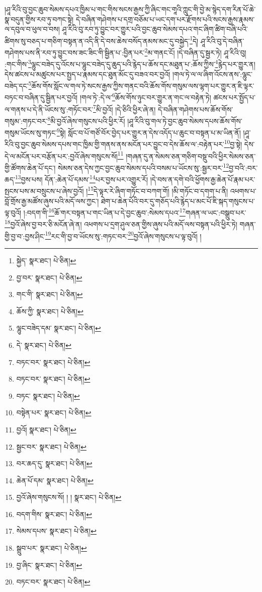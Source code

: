།ཤཱ་རིའི་བུ་བྱང་ཆུབ་སེམས་དཔའ་ཁྱིམ་པ་གང་གིས་སངས་རྒྱས་ཀྱི་ཞིང་གང་གཱའི་ཀླུང་གི་བྱེ་མ་སྙེད་དག་རིན་པོ་ཆེ་སྣ་བདུན་གྱིས་རབ་ཏུ་བཀང་སྟེ། དེ་བཞིན་གཤེགས་པ་དགྲ་བཅོམ་པ་ཡང་དག་པར་རྫོགས་པའི་སངས་རྒྱས་རྣམས་ལ་དབུལ་བ་ཕུལ་བ་བས། ཤཱ་རིའི་བུ་རབ་ཏུ་བྱུང་བར་གྱུར་པའི་བྱང་ཆུབ་སེམས་དཔའ་གང་ཞིག་ཚིག་བཞི་པའི་ཚིགས་སུ་བཅད་པ་གཅིག་བསྟན་ན་འདི་ནི་དེ་བས་ཆེས་བསོད་ནམས་མང་དུ་བསྐྱེད་\footnote{སྐྱེད་  སྣར་ཐང་།  པེ་ཅིན། }དེ། ཤཱ་རིའི་བུ་དེ་བཞིན་གཤེགས་པས་ནི་རབ་ཏུ་བྱུང་བས་ཟང་ཟིང་གི་སྦྱིན་པ་:བྱིན་པར་\footnote{བྱ་བར་  སྣར་ཐང་།  པེ་ཅིན། }མ་གནང་ངོ། །དེ་བཞིན་དུ་སྦྱར་ཏེ། ཤཱ་རིའི་བུ། :གང་གིས་\footnote{གང་གི་  སྣར་ཐང་།  པེ་ཅིན། }ལྷུང་བཟེད་དུ་འོངས་པ་ལྷུང་བཟེད་དུ་ཆུད་པའི་རྙེད་པ་ཆོས་དང་མཐུན་པ་:ཆོས་ཀྱིས་\footnote{ཆོས་ཀྱི་  སྣར་ཐང་།  པེ་ཅིན། }རྙེད་པར་གྱུར་ན། དེས་ཚངས་པ་མཚུངས་པར་སྤྱད་པ་རྣམས་དང་ཐུན་མོང་དུ་བཟའ་བར་བྱའོ། །གལ་ཏེ་ལ་ལ་ཞིག་འོངས་ནས་:ལྷུང་བཟེད་དང་\footnote{ལྷུང་བཟེད་དམ་  སྣར་ཐང་།  པེ་ཅིན། }ཆོས་གོས་སློང་ལ་གལ་ཏེ་སངས་རྒྱས་ཀྱིས་གནང་བའི་ཆོས་གོས་གསུམ་ལས་ལྷག་པར་གྱུར་ན་ཇི་ལྟར་བཏང་བ་བཞིན་དུ་སྦྱིན་པར་བྱའོ། །གལ་ཏེ་:དེ་ལ་\footnote{དེ་  སྣར་ཐང་།  པེ་ཅིན། }ཆོས་གོས་ཉུང་བར་གྱུར་ན་གང་ལ་བརྟེན་ཏེ། ཚངས་པར་སྤྱོད་པ་ལ་གནས་པ་དེ་ནི་ཡོངས་སུ་:གཏོང་བར་\footnote{བཏང་བར་  སྣར་ཐང་།  པེ་ཅིན། }མི་བྱའོ། །དེ་ཅིའི་ཕྱིར་ཞེ་ན། དེ་བཞིན་གཤེགས་པས་ཆོས་གོས་གསུམ་:གཏང་བར་\footnote{བཏང་བར་  སྣར་ཐང་།  པེ་ཅིན། }མི་བྱའོ་ཞེས་གསུངས་པའི་ཕྱིར་རོ། །ཤཱ་རིའི་བུ་གལ་ཏེ་བྱང་ཆུབ་སེམས་དཔས་ཆོས་གོས་གསུམ་ཡོངས་སུ་གཏང་\footnote{བཏང་  སྣར་ཐང་།  པེ་ཅིན། }སྟེ། སློང་བ་པོ་གཙོ་བོར་བྱེད་པར་གྱུར་ན་དེས་འདོད་པ་ཆུང་བ་བསྟན་པ་མ་ཡིན་ནོ། །ཤཱ་རིའི་བུ་བྱང་ཆུབ་སེམས་དཔས་གང་ཁྱིམ་གྱི་གནས་ནས་མངོན་པར་བྱུང་བ་དེས་ཆོས་ལ་:བརྟེན་པར་\footnote{བསྟེན་པར་  སྣར་ཐང་།  པེ་ཅིན། }བྱ་སྟེ། དེས་དེ་ལ་མངོན་པར་བརྩོན་པར་:བྱའོ་ཞེས་གསུངས་སོ།\footnote{བྱའོ།  སྣར་ཐང་།  པེ་ཅིན། } །གཞན་དུ་ན་སེམས་ཅན་གཅིག་བསྡུ་བའི་ཕྱིར་སེམས་ཅན་གྱི་ཚོགས་ཆེན་པོ་དང་། སེམས་ཅན་དེས་ཀྱང་བྱང་ཆུབ་སེམས་དཔའི་བསམ་པ་ཡོངས་སུ་:སྦྱར་བར་\footnote{སྦྱང་བར་  སྣར་ཐང་།  པེ་ཅིན། }བྱ་བའི་:བར་ཆད་\footnote{བར་ཆད་དུ་  སྣར་ཐང་།  པེ་ཅིན། }བྱས་པས། དོན་:ཆེན་པོ་དམས་\footnote{ཆེན་པོ་དམ་  སྣར་ཐང་།  པེ་ཅིན། }པར་བྱས་པར་འགྱུར་རོ། །དེ་བས་ན་དགེ་བའི་ཕྱོགས་རྒྱ་ཆེན་པོ་རྣམ་པར་སྤངས་པས་མ་བསྲུངས་པ་ཞེས་བྱའོ། །\footnote{བྱའོ་ཞེས་གསུངས་སོ། ། །  སྣར་ཐང་།  པེ་ཅིན། }དེ་ལྟར་རེ་ཞིག་གཏོང་བ་བཀག་གོ། །མི་གཏོང་བ་དགག་པ་ནི། འཕགས་པ་བློ་གྲོས་རྒྱ་མཚོས་ཞུས་པའི་མདོ་ལས་ཀྱང་། ཐེག་པ་ཆེན་པོའི་བར་དུ་གཅོད་པའི་རྙེད་པ་མང་པོ་ཇི་སྐད་གསུངས་པ་ལྟ་བུའོ། །:བདག་གི་\footnote{བདག་གིས་  སྣར་ཐང་།  པེ་ཅིན། }ཆོ་གར་བསྟན་པ་གང་ཡིན་པ་དེ་བྱང་ཆུབ་:སེམས་དཔའ་\footnote{སེམས་དཔས་  སྣར་ཐང་།  པེ་ཅིན། }གཞན་ལ་ཡང་:བསྒྲུབ་པར་\footnote{སྒྲུབ་པར་  སྣར་ཐང་།  པེ་ཅིན། }བྱའོ་ཞེས་བྱ་བར་ཅི་མངོན་ཞེ་ན། འཕགས་པ་དྲག་ཤུལ་ཅན་གྱིས་ཞུས་པའི་མདོ་ལས་བསྟན་པའི་ཕྱིར་ཏེ། གཞན་གྱི་བྱ་བ་:བྱས་ཤིང་\footnote{བྱ་ཞིང་  སྣར་ཐང་།  པེ་ཅིན། }རང་གི་བྱ་བ་ཡོངས་སུ་:གཏང་བར་\footnote{བཏང་བར་  སྣར་ཐང་།  པེ་ཅིན། }བྱའོ་ཞེས་གསུངས་པ་ལྟ་བུའོ། །
